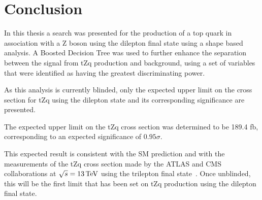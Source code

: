 \chapter{Conclusion}\label{chapter:conclusion}
In this thesis a search was presented for the production of a top quark in association with a Z boson using the dilepton final state using a shape based analysis.
A Boosted Decision Tree was used to further enhance the separation between the signal from tZq production and background, using a set of variables that were identified as having the greatest discriminating power.

As this analysis is currently blinded, only the expected upper limit on the cross section for tZq using the dilepton state and its corresponding significance are presented.

The expected upper limit on the tZq cross section was determined to be 189.4 fb, corresponding to an expected significance of $0.95 \sigma$.

This expected result is consistent with the SM prediction and with the measurements of the tZq cross section made by the ATLAS and CMS collaborations at $\sqrt{s} = 13 \,\text{Te\hspace{-.08em}V}$ using the trilepton final state~\cite{Aaboud:2017ylb,Sirunyan:2017nbr}.  
Once unblinded, this will be the first limit that has been set on tZq production using the dilepton final state.

%
%


